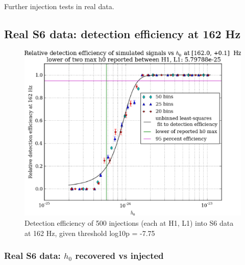 
Further injection tests in real data.


\subsection{Real S6 data: detection efficiency at 162 Hz}

\begin{figure}
\begin{center}
\includegraphics[width=0.4\paperwidth,height=0.2\paperheight]{plots/detectionEfficiencyh0-162-0Hz.eps}
\caption{
Detection efficiency of 500 injections (each at H1, L1) into
S6 data at 162 Hz, given threshold log10p = -7.75}
\end{center}
\end{figure}

\subsubsection{Real S6 data: $h_0$ recovered vs injected}

